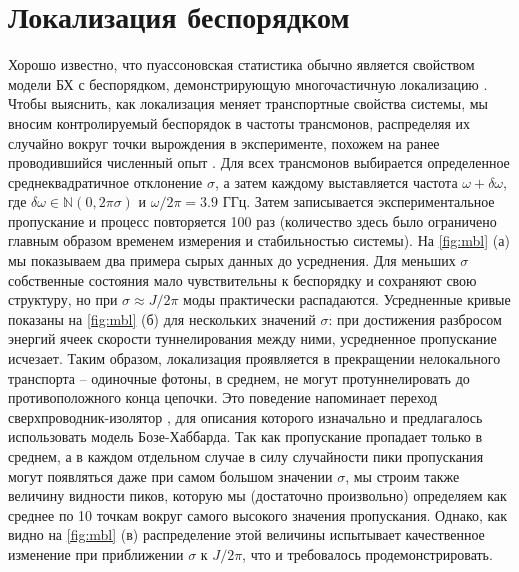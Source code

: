 \documentclass[14pt, a4paper]{extreport}
\numberwithin{equation}{section}
\begin{document}
\section{Локализация беспорядком}

Хорошо известно, что пуассоновская статистика обычно является свойством модели БХ с беспорядком, демонстрирующую многочастичную локализацию \cite{roushan2017spectroscopic, Yan2019,Ye2019}. Чтобы выяснить, как локализация меняет транспортные свойства системы, мы вносим контролируемый беспорядок в частоты трансмонов, распределяя их случайно вокруг точки вырождения в эксперименте, похожем на ранее проводившийся численный опыт \cite{orell2019probing}. Для всех трансмонов выбирается определенное среднеквадратичное отклонение $\sigma$, а затем каждому выставляется частота $\omega + \delta \omega$, где $\delta \omega \in \mathbb{N}(0, 2\pi \sigma)$ и $\omega/2\pi = 3.9$ ГГц. Затем записывается экспериментальное пропускание и процесс повторяется 100 раз (количество здесь было ограничено главным образом временем измерения и стабильностью системы). На \autoref{fig:mbl} (а) мы показываем два примера сырых данных до усреднения. Для меньших $\sigma$ собственные состояния мало чувствительны к беспорядку и сохраняют свою структуру, но при $\sigma \approx J/2\pi$ моды практически распадаются. Усредненные кривые показаны на \autoref{fig:mbl} (б) для нескольких значений $\sigma$: при достижения разбросом энергий ячеек скорости туннелирования между ними, усредненное пропускание исчезает. Таким образом, локализация проявляется в прекращении нелокального транспорта -- одиночные фотоны, в среднем, не могут протуннелировать до противоположного конца цепочки. Это поведение напоминает переход сверхпроводник-изолятор \cite{bruder1993superconductor}, для описания которого изначально и предлагалось использовать модель Бозе-Хаббарда. Так как пропускание пропадает только в среднем, а в каждом отдельном случае в силу случайности пики пропускания могут появляться даже при самом большом значении $\sigma$, мы строим также величину видности пиков, которую мы (достаточно произвольно) определяем как среднее по 10 точкам вокруг самого высокого значения пропускания. Однако, как видно на \autoref{fig:mbl} (в) распределение этой величины испытывает качественное изменение при приближении $\sigma$ к $J/2\pi$, что и требовалось продемонстрировать.
\end{document}
